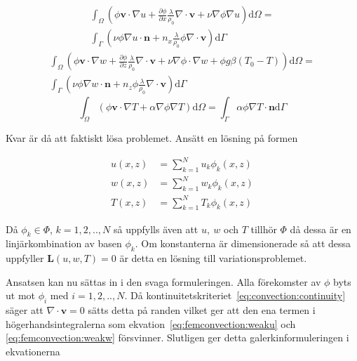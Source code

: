 \begin{align}
\int_\Omega \left(\phi\mathbf{v}\cdot\nabla u +
\frac{\partial \phi}{\partial x}\frac{\lambda}{\rho_0}\nabla\cdot\mathbf{v}
+\nu\nabla\phi\nabla u\right)\mathrm{d}\Omega = \nonumber \\
\int_\Gamma\left( \nu\phi\nabla u\cdot\mathbf{n} +
n_x\frac{\lambda}{\rho_0}\phi\nabla\cdot\mathbf{v}\right)\mathrm{d}\Gamma
\label{eq:femconvection:weaku}
\end{align}
\begin{align}
\int_\Omega\left(\phi\mathbf{v}\cdot\nabla w
+ \frac{\partial \phi}{\partial z} \frac{\lambda}{\rho_0}\nabla\cdot\mathbf{v}
+ \nu\nabla\phi\cdot\nabla w + \phi g\beta(T_0-T)\right)\mathrm{d}\Omega
= \nonumber \\
\int_\Gamma\left(\nu\phi\nabla w\cdot\mathbf{n} +
n_z\phi\frac{\lambda}{\rho_0}\nabla\cdot\mathbf{v}\right)\mathrm{d}\Gamma
\label{eq:femconvection:weakw}
\end{align}
\begin{equation}
\int_\Omega\left(\phi\mathbf{v}\cdot\nabla T + \alpha\nabla\phi\nabla T\right)\mathrm{d}\Omega
= \int_\Gamma \alpha\phi\nabla T\cdot\mathbf{n}\mathrm{d}\Gamma
\label{eq:femconvection:weakT}
\end{equation}


Kvar är då att faktiskt lösa problemet.
Ansätt en lösning på formen

\begin{align}
u(x,z) &= \sum^N_{k=1}u_k\phi_k(x,z)
\nonumber \\
w(x,z) &= \sum^N_{k=1}w_k\phi_k(x,z)
\nonumber \\
T(x,z) &= \sum^N_{k=1}T_k\phi_k(x,z)
\label{eq:femconvection:ansatz}
\end{align}

Då $\phi_k \in \Phi$, $k=1,2,..,N$ så uppfylls även att $u,~w$ och $T$ tillhör
$\Phi$ då dessa är en linjärkombination av basen $\phi_k$. Om konstanterna
är dimensionerade så att dessa uppfyller $\mathbf{L}(u,w,T) = 0$ är detta
en lösning till variationsproblemet. \cite{johnson2009}\cite{heath2002}\cite{lewis04}

Ansatsen kan nu sättas in i den svaga formuleringen.
Alla förekomster av $\phi$ byts ut mot $\phi_i$ med $i=1,2,..,N$. Då
kontinuitetskriteriet~\eqref{eq:convection:continuity} säger att
$\nabla\cdot\mathbf{v} = 0$ sätts detta på randen vilket ger att den
ena termen i högerhandsintegralerna som ekvation~\eqref{eq:femconvection:weaku} och
\eqref{eq:femconvection:weakw}
försvinner. Slutligen ger
detta galerkinformuleringen i ekvationerna

